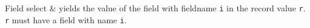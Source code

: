 \item[Semantics of Operators:]  \mbox{}

\begin{TypeSemantics}
Field select & yields the value of the field with fieldname {\tt i}
in the record value {\tt r}. {\tt r} must have a field with name
{\tt i}. \\ \hline
\end{TypeSemantics}

